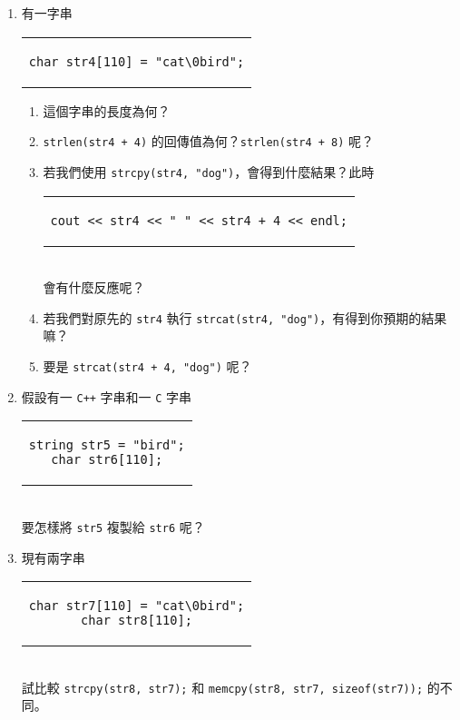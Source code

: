 \documentclass[12pt,a4paper,oneside]{article}
\begin{document}
\begin{CJK}{UTF8}{bkai}
\begin{enumerate}
\begin{enumerate}
  \end{enumerate}
\item 有一字串
\begin{code}[h!]
  \centering
  \begin{tabular}{c}
  \begin{lstlisting}
char str4[110] = "cat\0bird";
  \end{lstlisting}
  \end{tabular}
\end{code}
  \begin{enumerate}
  \item 這個字串的長度為何？
  \item \lstinline!strlen(str4 + 4)! 的回傳值為何？\lstinline!strlen(str4 + 8)! 呢？
  \item 若我們使用 \lstinline!strcpy(str4, "dog")!，會得到什麼結果？此時
  \begin{code}[h!]
    \centering
    \begin{tabular}{c}
    \begin{lstlisting}
cout << str4 << " " << str4 + 4 << endl;
    \end{lstlisting}
    \end{tabular}
  \end{code}
  \\會有什麼反應呢？
  \item 若我們對原先的 \lstinline!str4! 執行 \lstinline!strcat(str4, "dog")!，有得到你預期的結果嘛？
  \item 要是 \lstinline!strcat(str4 + 4, "dog")! 呢？
  \end{enumerate}
\item 假設有一 \texttt{C++} 字串和一 \texttt{C} 字串
\begin{code}[h!]
  \centering
  \begin{tabular}{c}
  \begin{lstlisting}
string str5 = "bird";
char str6[110];
  \end{lstlisting}
  \end{tabular}
\end{code}
\\要怎樣將 \lstinline!str5! 複製給 \lstinline!str6! 呢？
\item 現有兩字串
\begin{code}[h!]
  \centering
  \begin{tabular}{c}
  \begin{lstlisting}
char str7[110] = "cat\0bird";
char str8[110];
  \end{lstlisting}
  \end{tabular}
\end{code}
\\試比較 \lstinline!strcpy(str8, str7);! 和 \lstinline!memcpy(str8, str7, sizeof(str7));! 的不同。
\end{enumerate}


\end{CJK}
\end{document}

